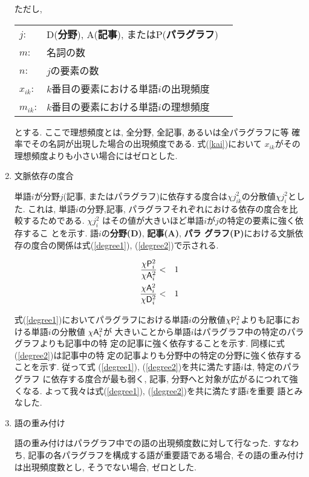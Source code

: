 \begin{enumerate}
ただし,

\begin{tabular}{lll}
$j$:  & {\sf D}({\bf 分野}), {\sf A}({\bf 記事}), または{\sf P}({\bf パラグラフ}) \\
$m$: &名詞の数 \\
$n$: &$j$の要素の数 \\
$x_{ik}$: &$k$番目の要素における単語$i$の出現頻度 \\
$m_{ik}$: &$k$番目の要素における単語$i$の理想頻度 \\
\end{tabular}

\noindent
とする.  ここで理想頻度とは, 全分野, 全記事, あるいは全パラグラフに等
確率でその名詞が出現した場合の出現頻度である.  式(\ref{kai})において
$x_{ik}$がその理想頻度よりも小さい場合にはゼロとした.

\item 文脈依存の度合

単語$i$が分野$j$(記事, またはパラグラフ)に依存する度合は$\chi
j^{2}_{ik}$の分散値$\chi j^{2}_{i}$とした.  これは, 単語$i$の分野,記事, 
パラグラフそれぞれにおける依存の度合を比較するためである. 
\hspace{-0.15mm}$\chi j^{2}_{i}$\hspace{-0.25mm}
はその値が大きいほど単語$i$\hspace{-0.15mm}が$j$\hspace{-0.15mm}の特定の要素に強く依存するこ
とを示す.  語$i$の{\bf 分野({\sf D})}, {\bf 記事({\sf A})}, {\bf パラ
グラフ({\sf P})}における文脈依存の度合の関係は式(\ref{degree1}),
(\ref{degree2})で示される.


\begin{eqnarray}
\frac{\chi {\sf P}^{2}_{i}}{\chi {\sf A}^{2}_{i}} & < & 1 \label{degree1} \\
\frac{\chi {\sf A}^{2}_{i}}{\chi {\sf D}^{2}_{i}} & < & 1 \label{degree2} 
\end{eqnarray}

\noindent
式(\ref{degree1})においてパラグラフにおける単語$i$の分散値$\chi {\sf
P}^{2}_{i}$よりも記事における単語$i$の分散値 \hspace{-0.25mm}$\chi {\sf A}^{2}_{i}$\hspace{-0.01mm}が
大きいことから単語$i$はパラグラフ中の特定のパラグラフよりも記事中の特
定の記事に強く依存することを示す.  同様に式(\ref{degree2})は記事中の特
定の記事よりも分野中の特定の分野に強く依存することを示す.  従って式
\hspace{-0.05mm}(\ref{degree1}), (\ref{degree2})を共に満たす語$i$は, 特定のパラグラフ
に依存する度合が最も弱く, 記事, 分野へと対象が広がるにつれて強くなる.
よって我々は式(\ref{degree1}), (\ref{degree2})を共に満たす語$i$を重要
語とみなした.

\item 語の重み付け

語の重み付けはパラグラフ中での語の出現頻度数に対して行なった.  すなわ
ち, 記事の各パラグラフを構成する語が重要語である場合, その語の重み付け
は出現頻度数とし, そうでない場合, ゼロとした.

\end{enumerate}



